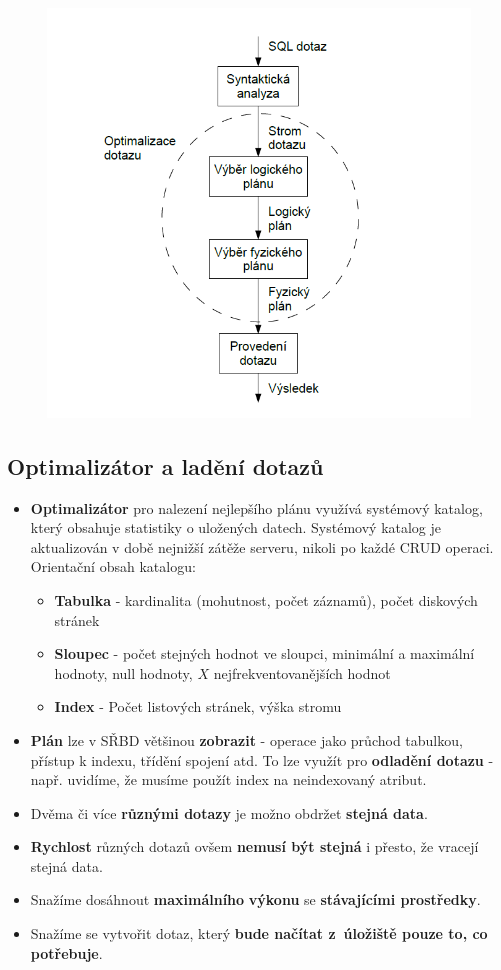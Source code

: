 \begin{figure}[H]
	\includegraphics{assets/zpracovani_dotazu.png}
\end{figure}

\subsection{Optimalizátor a ladění dotazů}
\begin{itemize}
	\item \textbf{Optimalizátor} pro nalezení nejlepšího plánu využívá systémový katalog, který obsahuje statistiky o uložených datech. Systémový katalog je aktualizován v době nejnižší zátěže serveru, nikoli po každé CRUD operaci. Orientační obsah katalogu:
	\begin{itemize}
		\item \textbf{Tabulka} - kardinalita (mohutnost, počet záznamů), počet diskových stránek
		\item \textbf{Sloupec} - počet stejných hodnot ve sloupci, minimální a maximální hodnoty, null hodnoty, $X$ nejfrekventovanějších hodnot
		\item \textbf{Index} - Počet listových stránek, výška stromu
	\end{itemize}
	\item \textbf{Plán} lze v SŘBD většinou \textbf{zobrazit} - operace jako průchod tabulkou, přístup k indexu, třídění spojení atd. To lze využít pro \textbf{odladění dotazu} - např. uvidíme, že musíme použít index na neindexovaný atribut.
	\item Dvěma či více \textbf{různými dotazy} je možno obdržet \textbf{stejná data}. 
	\item \textbf{Rychlost} různých dotazů ovšem\textbf{ nemusí být stejná }i přesto, že vracejí stejná data.
	\item Snažíme dosáhnout \textbf{maximálního} \textbf{výkonu} se \textbf{stávajícími prostředky}.
	\item Snažíme se vytvořit dotaz, který\textbf{ bude načítat z úložiště pouze to, co potřebuje}.
\end{itemize}

